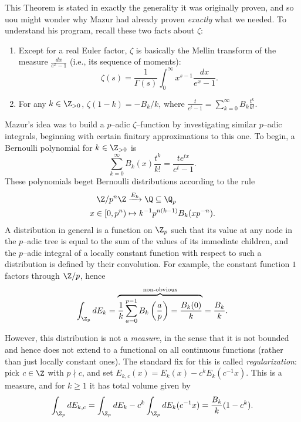 \noindent This Theorem is stated in exactly the generality it was originally proven, and so uou might wonder why Mazur had already proven \emph{exactly} what we needed.  To understand his program, recall these two facts about $\zeta$:
\begin{enumerate}
    \item Except for a real Euler factor, $\zeta$ is basically the Mellin transform of the measure $\frac{dx}{e^x - 1}$ (i.e., its sequence of moments): \[\zeta(s) = \frac{1}{\Gamma(s)} \int_0^\infty x^{s-1} \frac{dx}{e^x - 1}.\]
    \item For any $k \in \Z_{> 0}$, $\zeta(1 - k) = -B_k / k$, where $\frac{t}{e^t - 1} = \sum_{k=0}^\infty B_k \frac{t^k}{k!}$.
\end{enumerate}
Mazur's idea was to build a $p$--adic $\zeta$--function by investigating similar $p$--adic integrals, beginning with certain finitary approximations to this one.  To begin, a Bernoulli polynomial for $k \in \Z_{>0}$ is \[\sum_{k=0}^\infty B_k(x) \frac{t^k}{k!} = \frac{t e^{tx}}{e^t - 1}.\]  These polynomials beget Bernoulli distributions according to the rule
\begin{align*}
\Z/p^n\Z & \xrightarrow{E_k} \Q \subseteq \Q_p \\
x \in [0, p^n) & \mapsto k^{-1} p^{n(k-1)} B_k(x p^{-n}).
\end{align*}
A distribution in general is a function on $\Z_p$ such that its value at any node in the $p$--adic tree is equal to the sum of the values of its immediate children, and the $p$--adic integral of a locally constant function with respect to such a distribution is defined by their convolution.  For example, the constant function $1$ factors through $\Z/p$, hence \[\int_{\Z_p} dE_k = \overset{\text{non-obvious}}{\overbrace{\frac{1}{k} \sum_{a=0}^{p-1} B_k\left(\frac{a}{p}\right) = \frac{B_k(0)}{k}}} = \frac{B_k}{k}.\]

However, this distribution is not a \emph{measure}, in the sense that it is not bounded and hence does not extend to a functional on all continuous functions (rather than just locally constant ones).  The standard fix for this is called \emph{regularization}: pick $c \in \Z$ with $p \nmid c$, and set $E_{k,c}(x) = E_k(x) - c^kE_k(c^{-1}x)$.  This is a measure, and for $k \ge 1$ it has total volume given by \[\int_{\Z_p} dE_{k,c} = \int_{\Z_p} dE_k - c^k \int_{\Z_p} dE_k(c^{-1}x) = \frac{B_k}{k}(1 - c^k).\]

